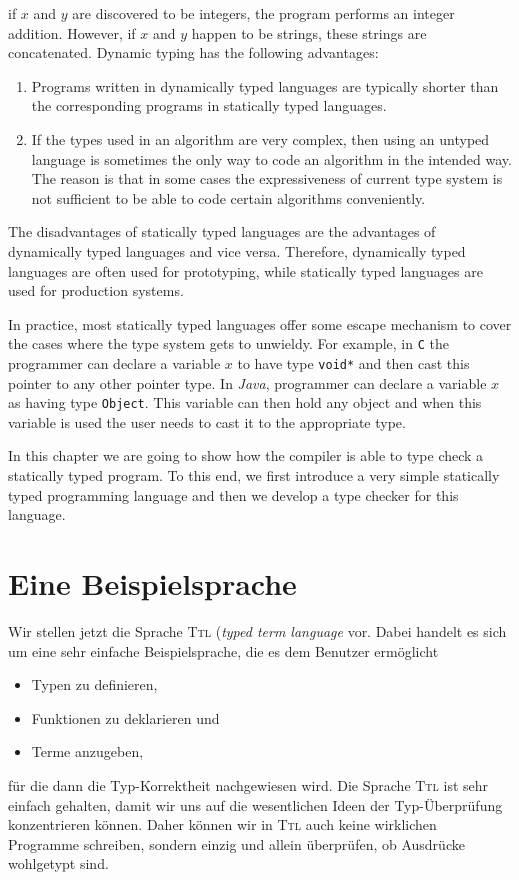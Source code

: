 \begin{enumerate}
      if $x$ and $y$ are discovered to be integers, the program performs an integer
      addition.  However, if $x$ and $y$ happen to be strings,  these strings are 
      concatenated.  Dynamic typing  has the following advantages:
      \begin{enumerate}
      \item Programs written in dynamically typed languages are typically shorter
            than the corresponding programs in statically typed languages.  
      \item If the types used in an algorithm are very complex, then using an untyped
            language is sometimes the only way to code an algorithm in the intended way. 
            The reason is that in some cases the expressiveness of current type system is 
            not sufficient to be able to code certain algorithms conveniently.
      \end{enumerate}
\end{enumerate}
The disadvantages of statically typed languages are the advantages of dynamically typed
languages and vice versa.  Therefore, dynamically typed languages are often used for
prototyping, while statically typed languages are used for production systems.

In practice, most statically typed languages offer some escape mechanism to cover the
cases where the type system gets to unwieldy.  For example, in \texttt{C} the programmer
can declare a variable $x$ to have type \texttt{void*} and then cast this pointer to any other
pointer type.  In \textsl{Java}, programmer can declare a variable $x$ as having type \texttt{Object}.
This variable can then hold any object and when this variable is used the user 
needs to cast it to the appropriate type.  

In this chapter we are going to show how the compiler is able to type check a statically
typed program.  To this end,  we first introduce a very simple statically typed programming
language and then we develop a type checker for this language.


\section{Eine Beispielsprache}
Wir stellen jetzt die Sprache \textsc{Ttl} (\emph{typed term language} vor.  Dabei handelt es sich
um eine sehr einfache Beispielsprache, die es dem Benutzer erm\"oglicht
\begin{itemize}
\item Typen zu definieren,
\item Funktionen zu deklarieren und
\item Terme anzugeben,
\end{itemize}
f\"ur die dann die Typ-Korrektheit nachgewiesen wird.
Die Sprache \textsc{Ttl} ist sehr einfach gehalten,
damit wir uns auf die wesentlichen Ideen der Typ-\"Uberpr\"ufung konzentrieren k\"onnen.
Daher k\"onnen wir in \textsc{Ttl} auch keine wirklichen Programme schreiben,
sondern einzig und allein \"uberpr\"ufen, ob Ausdr\"ucke wohlgetypt sind.

